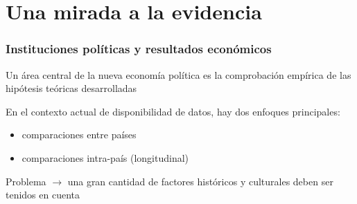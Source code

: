 \documentclass[handout,final,xcolor=dvipsnames]{beamer}
\begin{document}
\section{Una mirada a la evidencia}




\begin{frame}\frametitle{Instituciones políticas y resultados económicos}
Un área central de la nueva economía política es la comprobación empírica de las hipótesis teóricas desarrolladas \\  \medskip 

En el contexto actual de disponibilidad de datos, hay dos enfoques principales: \medskip 
\begin{itemize} \itemsep 10pt
\item comparaciones entre países
\item comparaciones intra-país (longitudinal)
\end{itemize} \medskip 

Problema $\longrightarrow$ una gran cantidad de factores históricos y culturales deben ser tenidos en cuenta
\end{frame}
\end{document}
